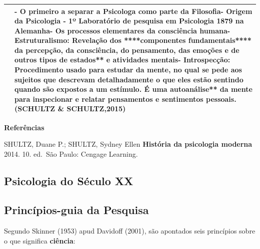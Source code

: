 \documentclass[
]{book}
\begin{document}
\begin{longtable}[]{@{}
  >{\centering\arraybackslash}p{}
  >{\raggedright\arraybackslash}p{}@{}}
\toprule()
\endhead
& - \textbf{O primeiro a separar a Psicologa} como parte da Filosofia- Origem da Psicologia - 1º Laboratório de pesquisa em Psicologia 1879 na Alemanha- Os processos elementares da consciência humana- \textbf{Estruturalismo}: Revelação dos ****componentes fundamentais**** da \textbf{percepção}, da \textbf{consciência}, do \textbf{pensamento}, das \textbf{emoções} e de \textbf{outros tipos de }estados** e \textbf{atividades} mentais\textbf{- }Introspecção\textbf{: Procedimento usado para estudar da mente, no qual se pede aos sujeitos que descrevam detalhadamente o que eles estão sentindo quando são expostos a um estímulo. É uma }autoanálise** da mente para \textbf{inspecionar} e \textbf{relatar} \textbf{pensamentos} e \textbf{sentimentos} pessoais. (SCHULTZ \& SCHULTZ,2015) \\
\bottomrule()
\end{longtable}

\textbf{Referências}

SHULTZ, Duane P.; SHULTZ, Sydney Ellen \textbf{História da psicologia moderna} 2014. 10. ed.~São Paulo: Cengage Learning.

\hypertarget{psicologia-do-suxe9culo-xx}{%
\subsection{Psicologia do Século XX}\label{psicologia-do-suxe9culo-xx}}

\hypertarget{princuxedpios-guia-da-pesquisa}{%
\subsection{Princípios-guia da Pesquisa}\label{princuxedpios-guia-da-pesquisa}}

Segundo Skinner (1953) apud Davidoff (2001), são apontados seis princípios sobre o que significa \textbf{ciência}:
\end{document}
